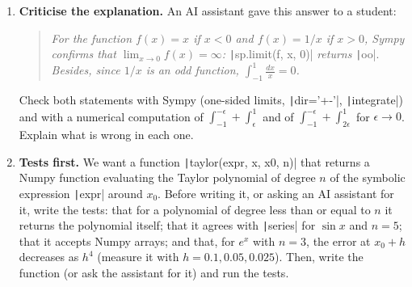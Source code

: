 \begin{enumerate}
\item \label{ej:sim_ia-en} \textbf{Criticise the explanation.} An AI assistant gave this answer to a student:
\begin{quote}
\emph{For the function $f(x)=x$ if $x<0$ and $f(x)=1/x$ if $x>0$, Sympy confirms that $\lim_{x\to0}f(x)=\infty$:} \texttt|sp.limit(f, x, 0)| \emph{returns} \texttt|oo|. \emph{Besides, since $1/x$ is an odd function, $\int_{-1}^{1}\frac{dx}{x}=0$.}
\end{quote}
Check both statements with Sympy (one-sided limits, \texttt|dir='+-'|, \texttt|integrate|) and with a numerical computation of $\int_{-1}^{-\epsilon}+\int_{\epsilon}^{1}$ and of $\int_{-1}^{-\epsilon}+\int_{2\epsilon}^{1}$ for $\epsilon\to0$. Explain what is wrong in each one.

\item \label{ej:sim_tests-en} \textbf{Tests first.} We want a function \texttt|taylor(expr, x, x0, n)| that returns a Numpy function evaluating the Taylor polynomial of degree $n$ of the symbolic expression \texttt|expr| around $x_0$. Before writing it, or asking an AI assistant for it, write the tests: that for a polynomial of degree less than or equal to $n$ it returns the polynomial itself; that it agrees with \texttt|series| for $\sin x$ and $n=5$; that it accepts Numpy arrays; and that, for $e^x$ with $n=3$, the error at $x_0+h$ decreases as $h^4$ (measure it with $h=0.1, 0.05, 0.025$). Then, write the function (or ask the assistant for it) and run the tests.
\end{enumerate}

\fussy
